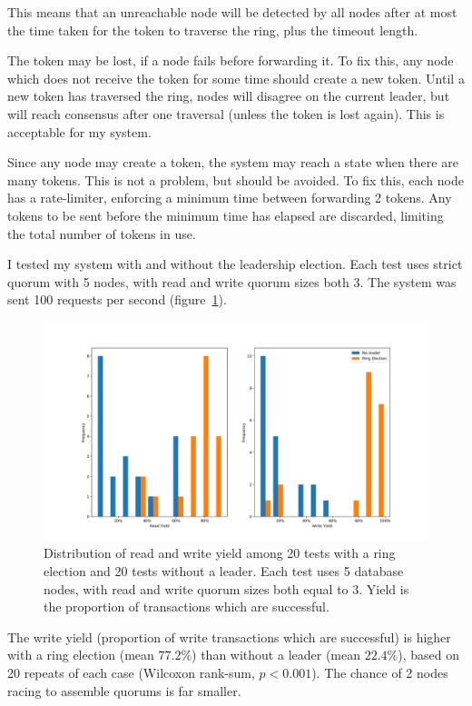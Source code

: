 \documentclass[12pt,a4paper,twoside,openany]{report}
\begin{document}
This means that an unreachable node will be detected by all nodes after at most the time taken for the token to traverse the ring, plus the timeout length.

The token may be lost, if a node fails before forwarding it. To fix this, any node which does not receive the token for some time should create a new token. Until a new token has traversed the ring, nodes will disagree on the current leader, but will reach consensus after one traversal (unless the token is lost again). This is acceptable for my system.

Since any node may create a token, the system may reach a state when there are many tokens. This is not a problem, but should be avoided. To fix this, each node has a rate-limiter, enforcing a minimum time between forwarding 2 tokens. Any tokens to be sent before the minimum time has elapsed are discarded, limiting the total number of tokens in use.

I tested my system with and without the leadership election. Each test uses strict quorum with 5 nodes, with read and write quorum sizes both 3. The system was sent 100 requests per second (figure~\ref{electorhist}).

\begin{figure}[ht]
\centerline{\includegraphics[width=\linewidth]{figs/elector-hist.png}}
\caption[Read and write yield in tests comparing my system with and without a leadership election]{Distribution of read and write yield among 20 tests with a ring election and 20 tests without a leader. Each test uses 5 database nodes, with read and write quorum sizes both equal to 3. Yield is the proportion of transactions which are successful.}
\label{electorhist}
\end{figure}

The write yield (proportion of write transactions which are successful) is higher with a ring election (mean $77.2\%$) than without a leader (mean $22.4\%$), based on 20 repeats of each case (Wilcoxon rank-sum, $p < 0.001$). The chance of 2 nodes racing to assemble quorums is far smaller.
\end{document}
